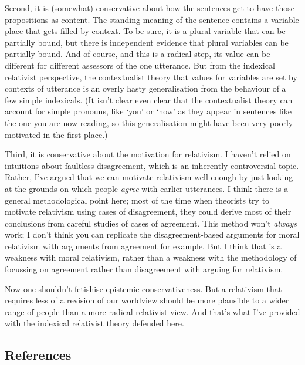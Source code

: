 \documentclass[
  10pt,
  letterpaper,
  DIV=11,
  numbers=noendperiod,
  twoside]{scrartcl}
\begin{document}
Second, it is (somewhat) conservative about how the sentences get to
have those propositions as content. The standing meaning of the sentence
contains a variable place that gets filled by context. To be sure, it is
a plural variable that can be partially bound, but there is independent
evidence that plural variables can be partially bound. And of course,
and this is a radical step, its value can be different for different
assessors of the one utterance. But from the indexical relativist
perspective, the contextualist theory that values for variables are set
by contexts of utterance is an overly hasty generalisation from the
behaviour of a few simple indexicals. (It isn't clear even clear that
the contextualist theory can account for simple pronouns, like `you' or
`now' as they appear in sentences like the one you are now reading, so
this generalisation might have been very poorly motivated in the first
place.)

Third, it is conservative about the motivation for relativism. I haven't
relied on intuitions about faultless disagreement, which is an
inherently controversial topic. Rather, I've argued that we can motivate
relativism well enough by just looking at the grounds on which people
\emph{agree} with earlier utterances. I think there is a general
methodological point here; most of the time when theorists try to
motivate relativism using cases of disagreement, they could derive most
of their conclusions from careful studies of cases of agreement. This
method won't \emph{always} work; I don't think you can replicate the
disagreement-based arguments for moral relativism with arguments from
agreement for example. But I think that is a weakness with moral
relativism, rather than a weakness with the methodology of focussing on
agreement rather than disagreement with arguing for relativism.

Now one shouldn't fetishise epistemic conservativeness. But a relativism
that requires less of a revision of our worldview should be more
plausible to a wider range of people than a more radical relativist
view. And that's what I've provided with the indexical relativist theory
defended here.

\subsection*{References}\label{references}
\end{document}
